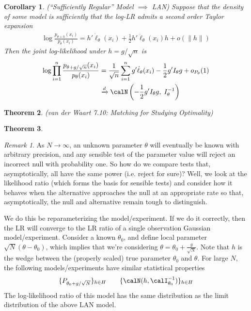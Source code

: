 \documentclass[12pt]{article}
\theoremstyle{plain}
\newtheorem{thm}{Theorem}[section]
\newtheorem{cor}[thm]{Corollary}
\theoremstyle{definition}
\theoremstyle{remark}
\newtheorem*{rmk}{Remark}
\newcommand{\ra}{\rightarrow}
\newcommand{\dto}{\xrightarrow{d}}
\newcommand{\sumin}{\sum^n_{i=1}}
\newcommand{\prodin}{\prod^n_{i=1}}
\begin{document}
\begin{cor}
\emph{(``Sufficiently Regular'' Model $\implies$ LAN)}
Suppose that the density of some model is sufficiently that the log-LR
admits a second order Taylor expansion
\begin{align*}
  \log
  \frac{p_{\theta+h}(x_i)}{p_\theta(x_i)}
  =
  h' \dot{\ell}_\theta(x_i)
  +
  \frac{1}{2}
  h'\ddot{\ell}_\theta(x_i) h
  +
  o(\lVert h \rVert)
\end{align*}
Then the joint log-likelihood under $h=g/\sqrt{n}$ is
\begin{align*}
  \log
  \prodin
  \frac{p_{\theta+g/\sqrt{n}}(x_i)}{p_\theta(x_i)}
  &=
  \frac{1}{\sqrt{n}}
  \sumin
  g' \dot{\ell}_\theta(x_i)
  -
  \frac{1}{2}
  g'I_{\theta} g
  +
  o_{P_\theta}(1)
  \\
  &\dto
  \calN\left(
  -\frac{1}{2}
  g'I_\theta g,\;
  I_\theta^{-1}
  \right)
\end{align*}
\end{cor}


\begin{thm}\emph{(van der Waart 7.10: Matching for Studying Optimality)}
\end{thm}


\begin{thm}
\end{thm}



\begin{rmk}
As $N\ra\infty$, an unknown parameter $\theta$ will eventually be known
with arbitrary precision, and any sensible test of the parameter value
will reject an incorrect null with probability one.
So how do we compare tests that, asymptotically, all have the same power
(i.e. reject for sure)?
Well, we look at the likelihood ratio (which forms the basis for
sensible tests) and consider how it behaves when the alternative
approaches the null at an appropriate rate so that, asymptotically, the
null and alternative remain tough to distinguish.

We do this be reparameterizing the model/experiment.
If we do it correctly, then the LR will converge to the LR ratio of a
single observation Gaussian model/experiment.
Consider a known $\theta_0$, and define local parameter
$\sqrt{N}(\theta-\theta_0)$, which implies that we're considering
$\theta=\theta_0+\frac{g}{\sqrt{N}}$.
Note that $h$ is the wedge between the (properly scaled) true parameter
$\theta_0$ and $\theta$.
For large $N$, the following models/experiments have similar statistical
properties
\begin{align*}
  \{P_{\theta_0+g/\sqrt{N}}\}_{h\in H}
  \qquad
  \{\calN(h,\calI_{\theta_0}^{-1})\}_{h\in H}
\end{align*}
The log-likelihood ratio of this model has the same distribution as the
limit distribution of the above LAN model.
\end{rmk}
\end{document}
